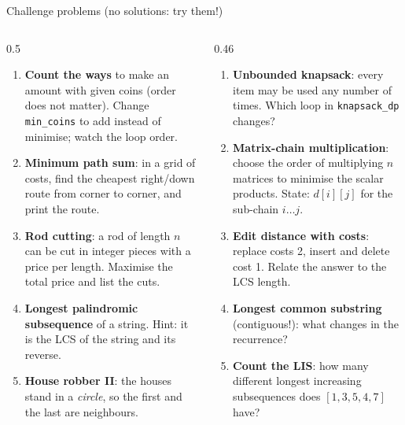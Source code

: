 \documentclass[aspectratio=169,10pt]{beamer}
\begin{document}
\begin{frame}{Challenge problems (no solutions: try them!)}
\begin{columns}[T]
\begin{column}{0.5\textwidth}
{\footnotesize
\begin{enumerate}\setlength\itemsep{3pt}
\item \textbf{Count the ways} to make an amount with given coins (order does not matter). Change \texttt{min\_coins} to add instead of minimise; watch the loop order.
\item \textbf{Minimum path sum}: in a grid of costs, find the cheapest right/down route from corner to corner, and print the route.
\item \textbf{Rod cutting}: a rod of length $n$ can be cut in integer pieces with a price per length. Maximise the total price and list the cuts.
\item \textbf{Longest palindromic subsequence} of a string. Hint: it is the LCS of the string and its reverse.
\item \textbf{House robber II}: the houses stand in a \emph{circle}, so the first and the last are neighbours.
\end{enumerate}}
\end{column}
\begin{column}{0.46\textwidth}
{\footnotesize
\begin{enumerate}\setlength\itemsep{3pt}\setcounter{enumi}{5}
\item \textbf{Unbounded knapsack}: every item may be used any number of times. Which loop in \texttt{knapsack\_dp} changes?
\item \textbf{Matrix-chain multiplication}: choose the order of multiplying $n$ matrices to minimise the scalar products. State: $d[i][j]$ for the sub-chain $i\ldots j$.
\item \textbf{Edit distance with costs}: replace costs 2, insert and delete cost 1. Relate the answer to the LCS length.
\item \textbf{Longest common substring} (contiguous!): what changes in the recurrence?
\item \textbf{Count the LIS}: how many different longest increasing subsequences does $[1,3,5,4,7]$ have?
\end{enumerate}}
\end{column}
\end{columns}
\end{frame}
\end{document}
